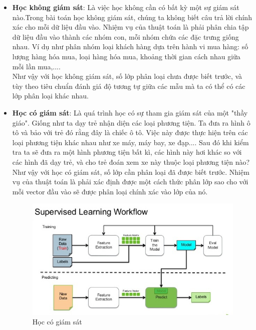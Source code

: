 \begin{itemize}
	\item \textbf{Học không giám sát}: Là việc học không cần có bất kỳ một sự giám sát nào.Trong bài toán học không giám sát, chúng ta không biết câu trả lời chính xác cho mỗi dữ liệu đầu vào. Nhiệm vụ của thuật toán là phải phân chia tập dữ liệu đầu vào thành các nhóm con, mỗi nhóm chứa các đặc trưng giống nhau. Ví dụ như phân nhóm loại khách hàng dựa trên hành vi mua hàng: số lượng hàng hóa mua, loại hàng hóa mua, khoảng thời gian cách nhau giữa mỗi lần mua,....\\
	 Như vậy với học không giám sát, số lớp phân loại chưa được biết trước, và tùy theo tiêu chuẩn đánh giá độ tương tự giữa các mẫu mà ta có thể có các lớp phân loại khác nhau.
	 
	\item \textbf{Học có giám sát}: Là quá trình học có sự tham gia giám sát của một "thầy giáo". Giống như ta dạy trẻ nhận diện các loại phương tiện. Ta đưa ra hình ô tô và bảo với trẻ đó rằng đây là chiếc ô tô. Việc này được thực hiện trên các loại phương tiện khác nhau như xe máy, máy bay, xe đạp.... Sau đó khi kiểm tra ta sẽ đưa ra một hình phương tiện bất kì, các hình này hơi khác so với các hình đã dạy trẻ, và cho trẻ đoán xem xe này thuộc loại phương tiện nào?\\
	Như vậy với học có giám sát, số lớp cần phân loại đã được biết trước. Nhiệm vụ của thuật toán là phải xác định được một cách thức phân lớp sao cho với mỗi vector đầu vào sẽ được phân loại chính xác vào lớp của nó.
\begin{center}
\begin{figure}[H]
\begin{center}
\includegraphics[scale=1.2]{chap3/image/supervise_workflow.jpeg}
\caption{Học có giám sát}
\label{fig:supervisedlearning}
\end{center}
\end{figure}
\end{center}

\end{itemize}


